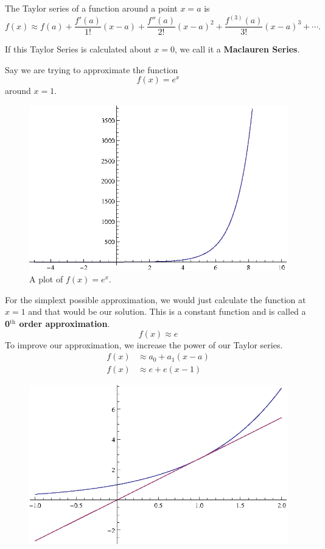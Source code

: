 \begin{theorem}
  The Taylor series of a function around a point $x=a$ is
  \[ f(x) \approx f(a) + \frac{f'(a)}{1!}(x-a) + \frac{f''(a)}{2!}(x-a)^2+\frac{f^{(3)}(a)}{3!}(x-a)^3+\cdots . \]
  \label{th:taylorseries}
\end{theorem}
If this Taylor Series is calculated about $x=0$, we call it a \textbf{Maclauren Series}.
\begin{ex}
   Say we are trying to approximate the function
  \[ f(x) =  e^x \]
  around $x=1$.
  \begin{figure}[H]
    \begin{center}
      \includegraphics{continuous/series/etx.eps}
    \end{center}
    \caption{A plot of $f(x)=e^x$.}
  \end{figure}
  For the simplext possible approximation, we would just calculate the function at $x=1$ and that would be our solution.
  This is a constant function and is called a \textbf{0$^\textrm{th}$ order approximation}.
  \[f(x) \approx e \]
  To improve our approximation, we increase the power of our Taylor series.
  \begin{align*}
    f(x) &\approx a_0 + a_1 (x-a)\\
    f(x) &\approx e + e (x-1)
  \end{align*}
  \begin{figure}[H]
    \begin{center}
      \includegraphics{continuous/series/1storder.eps}

\end{center}
\end{figure}
\end{ex}
